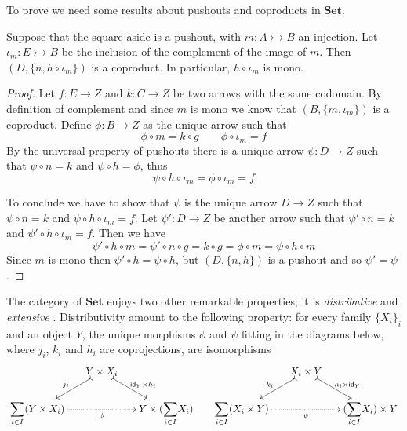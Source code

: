 \documentclass[3p]{elsarticle}
\newcommand{\Set}{\mathbf{Set}}
\newcommand{\Sum}{\mathlarger{\sum}}
\newcommand{\mto}{\rightarrowtail}
\newcommand{\id}[1]{\mathsf{id}_{#1}}
\theoremstyle{remark}
\theoremstyle{definition}
\begin{document}
To prove  we need some results about pushouts and coproducts in $\Set$.

\noindent 
\parbox{11.7cm}{
\begin{lem}\label{lem:po_set}
Suppose that the square aside is a pushout, with $m\colon A\mto B$ an injection. Let $\iota_{m}\colon E\mto B$ be the inclusion of the complement of the image of $m$. Then $(D, \{n, h\circ \iota_m \})$ is a coproduct. In particular, $h\circ \iota_m$ is mono.
\end{lem}}\hfill \parbox{2cm}{\vspace{0cm}}
\begin{proof}
		 Let $f\colon E\to Z$ and $k\colon C\to Z$ be two arrows with the same codomain. By definition of complement and since $m$ is mono we know that $(B, \{m, \iota_m\})$ is a coproduct. Define $\phi\colon B\to Z$ as the unique arrow such that \[\phi\circ m=k\circ g \qquad \phi \circ \iota_m=f\] 
		By the universal property of pushouts there is a unique arrow $\psi \colon D\to Z$ such that $\psi \circ n=k$ and $\psi \circ h=\phi$, thus 
		\[
		\psi \circ h\circ \iota_m =\phi \circ \iota_m=f\]
		
To conclude we have to show that $\psi$ is the unique arrow $D\to Z$ such that $\psi \circ n =k$ and $\psi \circ h\circ \iota_m=f$. Let $\psi'\colon D\to Z$ be another arrow such that $\psi' \circ n=k$ and $\psi' \circ h\circ \iota_m=f$. Then we have
		\[\psi'\circ h\circ m=\psi'\circ n\circ g=k\circ g=\phi \circ m =\psi \circ h\circ m \]
	Since $m$ is mono then $\psi'\circ h=\psi \circ h$,  but $(D, \{n, h\})$ is a pushout and so $\psi'=\psi$. 
\end{proof}

The category of $\Set$ enjoys two other remarkable properties; it is \emph{distributive} and \emph{extensive} \cite{carboni1993introduction}\label{word:ext}. Distributivity amount to the following property: for every family $\{X_i\}_{i}$ and an object $Y$, the unique morphisms $\phi$ and $\psi $ fitting in the diagrams below, where $j_i$, $k_i$ and $h_i$ are coprojections, are isomorphisms
\[\xymatrix@C=15pt@R=15pt{&Y\times X_i \ar@{>->}[dl]_{j_i} \ar@{>->}[dr]^{\id{Y}\times h_i} &&& X_i \times Y \ar@{>->}[dl]_{k_i} \ar@{>->}[dr]^{ h_i \times \id{Y}} \\ \Sum_{i\in I} (Y\times X_i) \ar@{.>}[rr]_{\phi}&& Y\times (\Sum_{i\in I}X_i) & \Sum_{i\in I}  (X_i \times Y )\ar@{.>}[rr]_{\psi}&&  (\Sum_{i\in I}X_i) \times Y }\]
\end{document}
